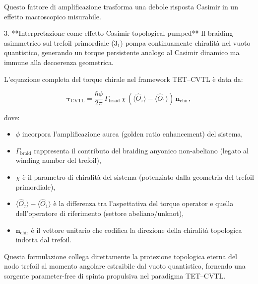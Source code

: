 \documentclass[11pt,a4paper]{article}
\theoremstyle{plain}
\theoremstyle{definition}
\begin{document}
   \vspace{0.2cm}
   Questo fattore di amplificazione trasforma una debole risposta Casimir in un effetto macroscopico misurabile.

   

\vspace{0.3cm}


3. **Interpretazione come effetto Casimir topological-pumped**  
   Il braiding asimmetrico sul trefoil primordiale ($3_1$) pompa continuamente chiralità nel vuoto quantistico, generando un torque persistente analogo al Casimir dinamico ma immune alla decoerenza geometrica. 
   
   
   \vspace{0.2cm}
   
   \begin{tcolorbox}[colback=teal!5!white, 
                  colframe=teal!70!black, 
                  title={Equazione chiave: Torque Chiral CVTL dal vuoto quantistico},
                  sharp corners,
                  boxrule=1.5pt,
                  fonttitle=\bfseries,
                  coltitle=yellow]
L'equazione completa del torque chirale nel framework TET--CVTL è data da:

\begin{equation}
\boldsymbol{\tau}_{\text{CVTL}} = \frac{\hbar \phi}{2\pi} \,\Gamma_{\text{braid}} \,\chi \,\left( \langle \hat{O}_{\tau} \rangle - \langle \hat{O}_{1} \rangle \right) \,\mathbf{n}_{\text{chir}},
\label{eq:tau_cvtl_casimir}
\end{equation}

dove:
\begin{itemize}
    \item \(\phi\) incorpora l'amplificazione aurea (golden ratio enhancement) del sistema,
    \item \(\Gamma_{\text{braid}}\) rappresenta il contributo del braiding anyonico non-abeliano (legato al winding number del trefoil),
    \item \(\chi\) è il parametro di chiralità del sistema (potenziato dalla geometria del trefoil primordiale),
    \item \(\langle \hat{O}_{\tau} \rangle - \langle \hat{O}_{1} \rangle\) è la differenza tra l'aspettativa del torque operator e quella dell'operatore di riferimento (settore abeliano/unknot),
    \item \(\mathbf{n}_{\text{chir}}\) è il vettore unitario che codifica la direzione della chiralità topologica indotta dal trefoil.
\end{itemize}

Questa formulazione collega direttamente la protezione topologica eterna del nodo trefoil al momento angolare estraibile dal vuoto quantistico, fornendo una sorgente parameter-free di spinta propulsiva nel paradigma TET--CVTL.
\end{tcolorbox}
\end{document}

